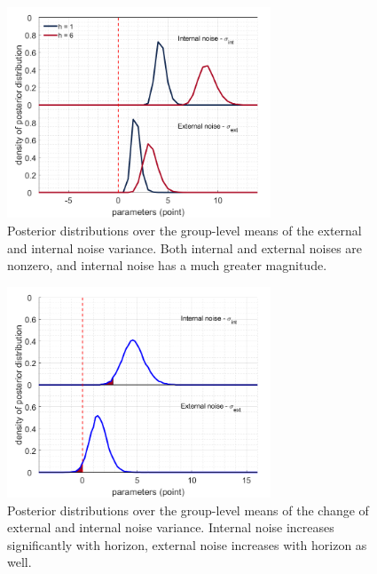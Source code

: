 \documentclass[12pt]{article}
\begin{document}
	
	\begin{figure}[H]
		\begin{center}
			\includegraphics[width=0.7\textwidth]{figures/dist_hypernoiseh.png}
			\caption[Posterior distributions over the group-level means of the external and internal noise variance.]{Posterior distributions over the group-level means of the external and internal noise variance. Both internal and external noises are nonzero, and internal noise has a much greater magnitude.}
			\label{fig:mb1}
		\end{center}
	\end{figure}
	
	
	
	
	
	\begin{figure}[H]
		\begin{center}
			\includegraphics[width=0.7\textwidth]{figures/dist_hypernoise.png}
			\caption[Posterior distributions over the group-level means of the change of external and internal noise variance.]{Posterior distributions over the group-level means of the change of external and internal noise variance. Internal noise increases significantly with horizon, external noise increases with horizon as well.}			
			\label{fig:mb2}
		\end{center}
	\end{figure}
	
\end{document}
